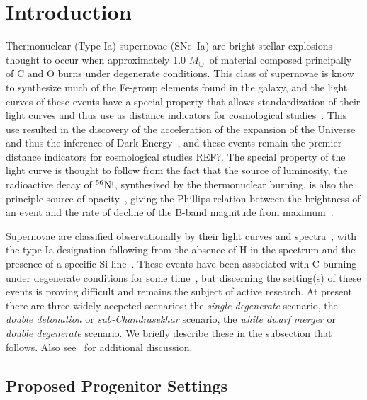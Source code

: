 \documentclass[iop,apj]{emulateapj}
\newcommand{\SNeIa}{SNe~Ia}
\newcommand{\Ni}[1]{\ensuremath{{}^{#1}{\rm Ni}}}
\newcommand{\Msun}{\ensuremath{M_\odot}}
\begin{document}
\section{Introduction}
\label{sec:intro}
Thermonuclear (Type Ia) supernovae (\SNeIa) are bright stellar explosions 
thought to occur when approximately 1.0 \Msun\ of material composed principally 
of C and O burns under degenerate conditions. This class of supernovae is
know to synthesize much of the Fe-group elements found in the galaxy, and
the light curves of these events have a special property that allows
standardization of their light curves and thus use
as distance indicators for cosmological studies~\citep{phillips:absolute}.
This use resulted in the discovery of the acceleration of the expansion of
the Universe and thus the inference of Dark 
Energy~\citep{riess.filippenko.ea:observational,
perlmutter.aldering.ea:measurements,leibundgut2001}, and these events
remain the premier distance indicators for cosmological studies {\color{red} REF?}. 
The special property of the light curve is thought to follow
from the fact that the source of luminosity, the radioactive decay
of \Ni{56}, synthesized by the thermonuclear burning, is also the
principle source of opacity~\citep{Pinto2001The-type-Ia-sup}, giving
the Phillips relation between the brightness of an event and the
rate of decline of the B-band magnitude from maximum~\citep{phillips:absolute}. 

Supernovae are classified observationally 
by their light curves and spectra~\citep{minkowski41,bertola64,porterfilippenko87,
wheelerharkness1990conf,Fili97}, with the type Ia designation following from
the absence of H in the spectrum and the presence of a specific Si 
line~\citep{filippenko:optical,hillebrandt.niemeyer:type}. These events
have been associated with C burning under degenerate conditions
for some time~\citep{hoylefowler60,arnett.truran.ea:nucleosynthesis},
but discerning the setting(s) of these events is proving difficult
and remains the subject of active research. At present there are three
widely-accpeted scenarios: the {\em single degenerate} scenario,
the {\em double detonation} or {\em sub-Chandrasekhar} scenario, 
the {\em white dwarf merger} or {\em double degenerate} scenario.
We briefly describe these in the subsection that follows.
Also see~\citet{hillebrandt.niemeyer:type,howell2011,hillebrandtetal2013,calderetal2013,roepkesim2018}
for additional discussion.

\subsection{Proposed Progenitor Settings}
\end{document}

